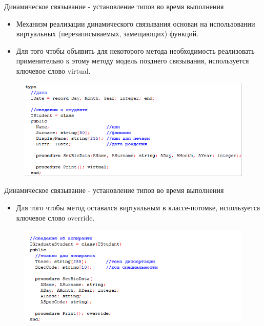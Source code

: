 \documentclass{beamer}
\begin{document}
\begin{frame}{Динамическое связывание - установление типов во время выполнения}
\begin{itemize}
\item Механизм реализации динамического связывания основан на использовании виртуальных (перезаписываемых, замещающих) функций.
\item Для того чтобы объявить для некоторого метода необходимость реализовать применительно к этому методу модель позднего связывания, используется ключевое слово virtual. 
\end{itemize}
\begin{figure}[h]
\centering
\includegraphics[scale=0.4]{images/lec07-pic06.png}
\end{figure}
\end{frame}

\begin{frame}{Динамическое связывание - установление типов во время выполнения}
\begin{itemize}
\item Для того чтобы метод оставался виртуальным в классе-потомке, используется ключевое слово override. 
\end{itemize}
\begin{figure}[h]
\centering
\includegraphics[scale=0.6]{images/lec07-pic07.png}
\end{figure}
\end{frame}
\end{document}
